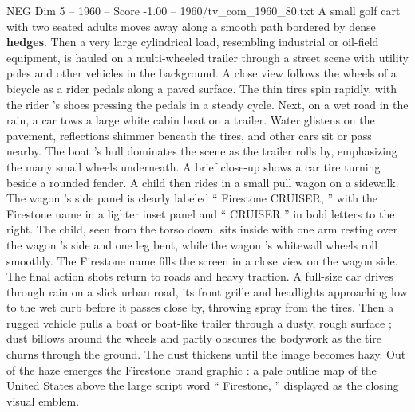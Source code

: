 \begin{textsample}{NEG Dim 5 – 1960 – Score -1.00 – 1960/tv\_com\_1960\_80.txt}
A small golf cart with two seated adults moves away along a smooth path bordered by dense \textbf{hedges}.
Then a very large cylindrical load, resembling industrial or oil-field equipment, is hauled on a multi-wheeled trailer through a street scene with utility poles and other vehicles in the background.
A close view follows the wheels of a bicycle as a rider pedals along a paved surface.
The thin tires spin rapidly, with the rider ’s shoes pressing the pedals in a steady cycle.
Next, on a wet road in the rain, a car tows a large white cabin boat on a trailer.
Water glistens on the pavement, reflections shimmer beneath the tires, and other cars sit or pass nearby.
The boat ’s hull dominates the scene as the trailer rolls by, emphasizing the many small wheels underneath.
A brief close-up shows a car tire turning beside a rounded fender.
A child then rides in a small pull wagon on a sidewalk.
The wagon ’s side panel is clearly labeled “ Firestone CRUISER, ” with the Firestone name in a lighter inset panel and “ CRUISER ” in bold letters to the right.
The child, seen from the torso down, sits inside with one arm resting over the wagon ’s side and one leg bent, while the wagon ’s whitewall wheels roll smoothly.
The Firestone name fills the screen in a close view on the wagon side.
The final action shots return to roads and heavy traction.
A full-size car drives through rain on a slick urban road, its front grille and headlights approaching low to the wet curb before it passes close by, throwing spray from the tires.
Then a rugged vehicle pulls a boat or boat-like trailer through a dusty, rough surface ; dust billows around the wheels and partly obscures the bodywork as the tire churns through the ground.
The dust thickens until the image becomes hazy.
Out of the haze emerges the Firestone brand graphic : a pale outline map of the United States above the large script word “ Firestone, ” displayed as the closing visual emblem.

\end{textsample}
